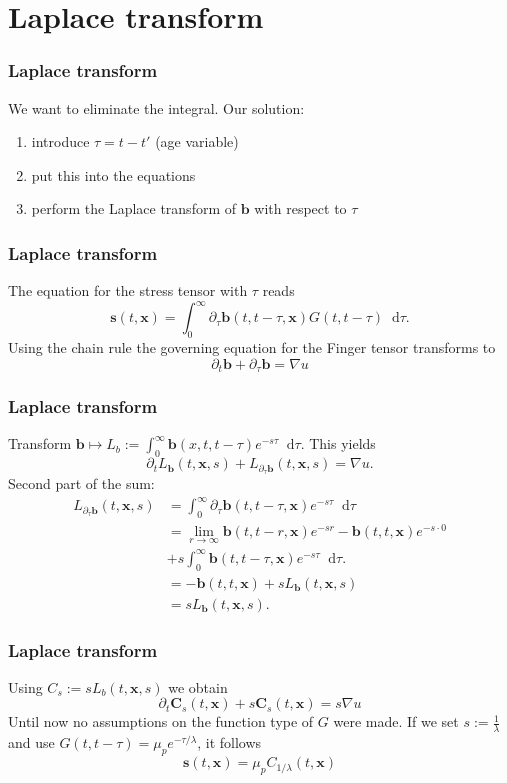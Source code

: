 \documentclass[12pt,a4paper,handout]{beamer}
\theoremstyle{definition}
\theoremstyle{plain}
\newcommand{\bfb}{\bm{b}}
\newcommand{\bfs}{\bm{s}}
\newcommand{\bfC}{\bm{C}}
\newcommand{\bfx}{\bm{x}}
\newcommand{\D}{\mathop{}\!\mathrm{d}}
\begin{document}
\section{Laplace transform}
\begin{frame}
    \frametitle{Laplace transform}
    We want to eliminate the integral. Our solution: 
    \begin{enumerate}[<+->]
        \item introduce $\tau= t-t'$ (age variable)
        \item put this into the equations
        \item perform the Laplace transform of $\bfb$ with respect to $\tau$
    \end{enumerate}
\end{frame}
\begin{frame}
    \frametitle{Laplace transform}
    The equation for the stress tensor with $\tau$ reads
    \begin{equation*}
        \bfs(t,\bfx)=\int_0^\infty\partial_\tau\bfb(t,t-\tau,\bfx)G(t,t-\tau)\D\tau.
    \end{equation*}
   Using the chain rule the governing equation for the Finger tensor transforms to  
   \begin{equation*}
   \partial_t \bfb +\partial_\tau\bfb=\nabla u
   \end{equation*}
\end{frame}
\begin{frame}
    \frametitle{Laplace transform}
    Transform $\bfb\mapsto L_b:=\int_0^\infty \bfb(x,t,t-\tau)e^{-s\tau}\D \tau$. This yields
    \begin{equation*}
    \partial_tL_{\bfb}(t,\bfx,s) + L_{\partial_\tau\bfb}(t,\bfx,s) = \nabla u.
    \end{equation*}
    Second part of the sum:
        \begin{align*}
        L_{\partial_\tau\bfb}(t,\bfx,s) &= \int_0^\infty\partial_\tau\bfb(t,t-\tau,\bfx)e^{-s\tau}\D\tau\\ &=\lim_{r\to\infty}\bfb(t,t-r,\bfx)e^{-sr}-\bfb(t,t,\bfx)e^{-s\cdot 0}\\&+s\int_0^\infty\bfb(t,t-\tau,\bfx)e^{-s\tau}\D\tau.\\
        &= -\bfb(t,t,\bfx) +sL_{\bfb}(t,\bfx, s)\\
        &= sL_{\bfb}(t,\bfx,s).
        \end{align*}
\end{frame}
\begin{frame}
    \frametitle{Laplace transform}
    Using $C_s:=sL_b(t,\bfx,s)$ we obtain
    \begin{equation*}
         \partial_t\bfC_s(t,\bfx)+s\bfC_s(t,\bfx)=s\nabla u
    \end{equation*}
    Until now no assumptions on the function type of $G$ were made.
    If we set $s:=\frac{1}{\lambda}$ and use $G(t,t-\tau)=\mu_pe^{-\tau/\lambda}$, it follows
    \begin{equation*}
        \bfs(t,\bfx)=\mu_pC_{1/\lambda}(t,\bfx)
    \end{equation*}
\end{frame}
\end{document}
